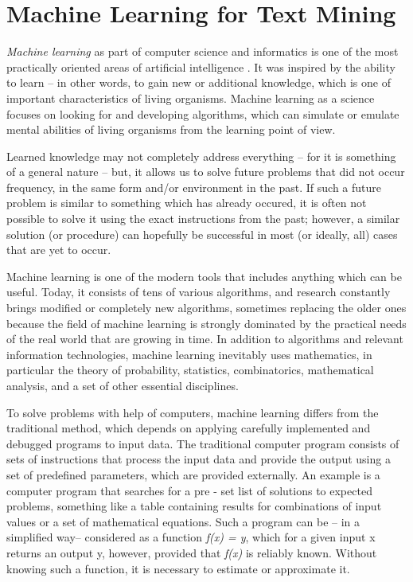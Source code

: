 \section{ Machine Learning for Text Mining}

\textit{Machine learning} \cite{ref199} as part of computer science and informatics is one of the most practically oriented areas of artificial intelligence \cite{ref161}. It was inspired by the ability to learn – in other words, to gain new or additional knowledge, which is one of important characteristics of living organisms. Machine learning as a
science focuses on looking for and developing algorithms, which can simulate or
emulate mental abilities of living organisms from the learning point of view.

Learned knowledge may not completely address everything – for it is something of a general nature – but, it allows us to solve future problems that did not
occur frequency, in the same form and/or environment in the past. If such a future problem is similar to something which has already occured, it is often not
possible to solve it using the exact instructions from the past; however, a similar
solution (or procedure) can hopefully be successful in most (or ideally, all) cases
that are yet to occur.

Machine learning is one of the modern tools that includes anything which can
be useful. Today, it consists of tens of various algorithms, and research constantly
brings modified or completely new algorithms, sometimes replacing the older
ones because the field of machine learning is strongly dominated by the practical
needs of the real world that are growing in time. In addition to algorithms and
relevant information technologies, machine learning inevitably uses mathematics, in particular the theory of probability, statistics, combinatorics, mathematical
analysis, and a set of other essential disciplines.

To solve problems with help of computers, machine learning differs from
the traditional method, which depends on applying carefully implemented and
debugged programs to input data. The traditional computer program consists of
sets of instructions that process the input data and provide the output using a set
of predefined parameters, which are provided externally. An example is a computer program that searches for a pre - set list of solutions to expected problems,
something like a table containing results for combinations of input values or
a set of mathematical equations. Such a program can be – in a simplified way–
considered as a function \textit{f(x) = y}, which for a given input x returns an output y,
however, provided that \textit{f(x)} is reliably known. Without knowing such a function,
it is necessary to estimate or approximate it.

